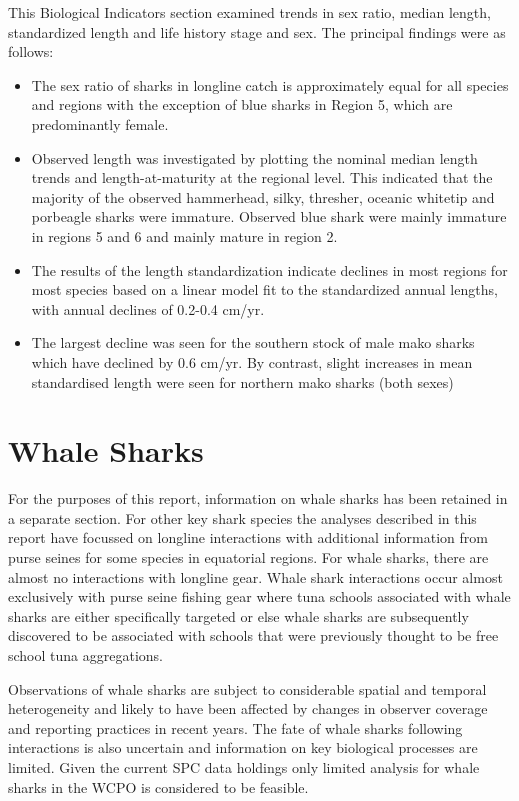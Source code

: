 \documentclass[12pt]{SCreport}
\begin{document}
This Biological Indicators section examined trends in sex ratio, median length, standardized length and life history stage and sex.  The principal findings were as follows:
\begin{itemize}
\item The sex ratio of sharks in longline catch is approximately equal for all species and regions with the exception of blue sharks in Region 5, which are predominantly female.
\item Observed length was investigated by plotting the nominal median length trends and length-at-maturity at the regional level. This indicated that the majority of the observed hammerhead, silky, thresher, oceanic whitetip and porbeagle sharks were immature. Observed blue shark were mainly immature in regions 5 and 6 and mainly mature in region 2.
\item The results of the length standardization indicate declines in most regions for most species based on a linear model fit to the standardized annual lengths, with annual declines of 0.2-0.4 cm/yr.
\item The largest decline was seen for the southern stock of male mako sharks which have declined by 0.6 cm/yr. By contrast, slight increases in mean standardised length were seen for northern mako sharks (both sexes)
\end{itemize}

      
 \clearpage     
  
\section{Whale Sharks}

For the purposes of this report, information on whale sharks has been retained in a separate section. For other key shark species the analyses described in this report have focussed on longline interactions with additional information from purse seines for some species in equatorial regions. For whale sharks, there are almost no interactions with longline gear. Whale shark interactions occur almost exclusively with purse seine fishing gear where tuna schools associated with whale sharks are either specifically targeted or else whale sharks are subsequently discovered to be associated with schools that were previously thought to be free school tuna aggregations.

Observations of whale sharks are subject to considerable spatial and temporal heterogeneity and likely to have been affected by changes in observer coverage and reporting practices in recent years. The fate of whale sharks following interactions is also uncertain and information on key biological processes are limited. Given the current SPC data holdings only limited analysis for whale sharks in the WCPO is considered to be feasible.
\end{document}
